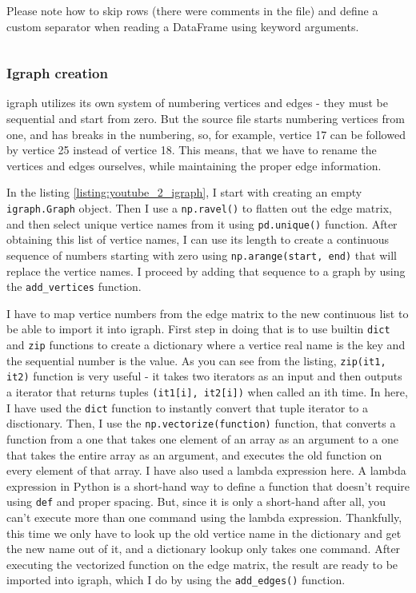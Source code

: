 \documentclass[12pt, a4paper]{article}
\begin{document}
Please note how to skip rows (there were comments in the file) and define a custom separator when reading a DataFrame using keyword arguments.

\bgroup
  \inputminted[linenos, breaklines=true, fontsize=\scriptsize]{python}{src/youtube/igraph_creation/1_pandas.py}
  \label{listing:youtube_1_pandas}
\egroup

\subsubsection{Igraph creation}

igraph utilizes its own system of numbering vertices and edges - they must be sequential and start from zero. But the source file starts numbering vertices from one, and has breaks in the numbering, so, for example, vertice 17 can be followed by vertice 25 instead of vertice 18. This means, that we have to rename the vertices and edges ourselves, while maintaining the proper edge information.

In the listing \ref{listing:youtube_2_igraph}, I start with creating an empty \texttt{igraph.Graph} object. Then I use a \texttt{np.ravel()} to flatten out the edge matrix, and then select unique vertice names from it using \texttt{pd.unique()} function. After obtaining this list of vertice names, I can use its length to create a continuous sequence of numbers starting with zero using \texttt{np.arange(start, end)} that will replace the vertice names. I proceed by adding that sequence to a graph by using the \texttt{add\_vertices} function.

I have to map vertice numbers from the edge matrix to the new continuous list to be able to import it into igraph. First step in doing that is to use builtin \texttt{dict} and \texttt{zip} functions to create a dictionary where a vertice real name is the key and the sequential number is the value. As you can see from the listing, \texttt{zip(it1, it2)} function is very useful - it takes two iterators as an input and then outputs a iterator that returns tuples \texttt{(it1[i], it2[i])} when called an ith time. In here, I have used the \texttt{dict} function to instantly convert that tuple iterator to a disctionary. Then, I use the \texttt{np.vectorize(function)} function, that converts a function from a one that takes one element of an array as an argument to a one that takes the entire array as an argument, and executes the old function on every element of that array. I have also used a lambda expression here. A lambda expression in Python is a short-hand way to define a function that doesn't require using \texttt{def} and proper spacing. But, since it is only a short-hand after all, you can't execute more than one command using the lambda expression. Thankfully, this time we only have to look up the old vertice name in the dictionary and get the new name out of it, and a dictionary lookup only takes one command. After executing the vectorized function on the edge matrix, the result are ready to be imported into igraph, which I do by using the \texttt{add\_edges()} function.
\end{document}
